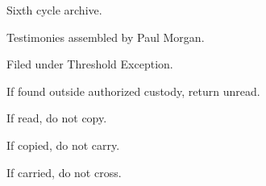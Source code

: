 \typethresholdexception

Sixth cycle archive.\par

Testimonies assembled by Paul Morgan.\par

Filed under Threshold Exception.\par

If found outside authorized custody, return unread.\par

If read, do not copy.\par

If copied, do not carry.\par

If carried, do not cross.\par

\ornament
